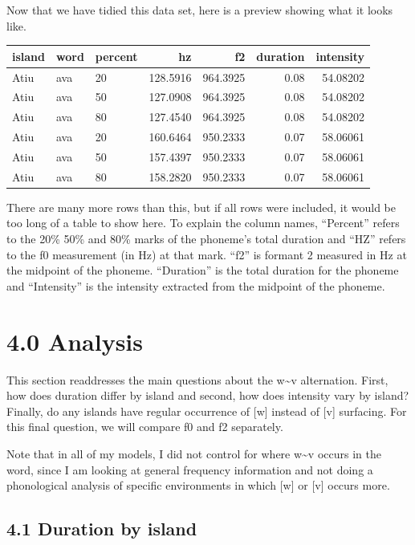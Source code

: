 \documentclass[
  ,man,floatsintext]{apa6}
\begin{document}
Now that we have tidied this data set, here is a preview showing what it looks like.

\begin{tabular}{l|l|l|r|r|r|r}
\hline
island & word & percent & hz & f2 & duration & intensity\\
\hline
Atiu & ava & 20 & 128.5916 & 964.3925 & 0.08 & 54.08202\\
\hline
Atiu & ava & 50 & 127.0908 & 964.3925 & 0.08 & 54.08202\\
\hline
Atiu & ava & 80 & 127.4540 & 964.3925 & 0.08 & 54.08202\\
\hline
Atiu & ava & 20 & 160.6464 & 950.2333 & 0.07 & 58.06061\\
\hline
Atiu & ava & 50 & 157.4397 & 950.2333 & 0.07 & 58.06061\\
\hline
Atiu & ava & 80 & 158.2820 & 950.2333 & 0.07 & 58.06061\\
\hline
\end{tabular}

There are many more rows than this, but if all rows were included, it would be too long of a table to show here. To explain the column names, ``Percent'' refers to the 20\% 50\% and 80\% marks of the phoneme's total duration and ``HZ'' refers to the f0 measurement (in Hz) at that mark. ``f2'' is formant 2 measured in Hz at the midpoint of the phoneme. ``Duration'' is the total duration for the phoneme and ``Intensity'' is the intensity extracted from the midpoint of the phoneme.

\section{4.0 Analysis}\label{analysis}

This section readdresses the main questions about the w\textasciitilde v alternation. First, how does duration differ by island and second, how does intensity vary by island? Finally, do any islands have regular occurrence of {[}w{]} instead of {[}v{]} surfacing. For this final question, we will compare f0 and f2 separately.

Note that in all of my models, I did not control for where w\textasciitilde v occurs in the word, since I am looking at general frequency information and not doing a phonological analysis of specific environments in which {[}w{]} or {[}v{]} occurs more.

\subsection{4.1 Duration by island}\label{duration-by-island}
\end{document}
